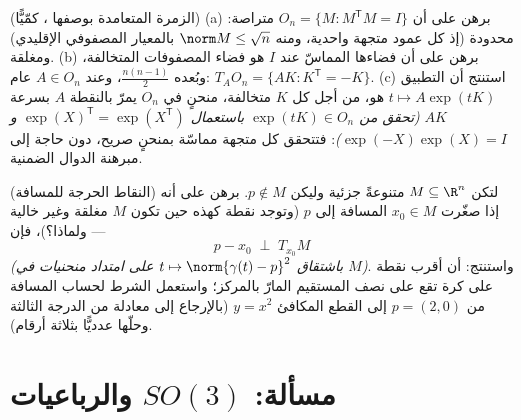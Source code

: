 \begin{exercise}[$\star\star$]\label{exo:b3:submanifolds:11}
(الزمرة المتعامدة بوصفها ، كمّيًّا)
(a) برهن على أن $O_n = \{M : M^{\mathsf T}M = I\}$ متراصة: محدودة (إذ كل عمود متجهة
واحدية، ومنه $\norm M \leq
\sqrt n$ بالمعيار المصفوفي الإقليدي) ومغلقة.
(b) برهن على أن فضاءها المماسّ عند $I$ هو فضاء المصفوفات
المتخالفة، وبُعده $\frac{n(n-1)}2$، وعند $A \in O_n$ عام:
$T_AO_n = \{AK : K^{\mathsf T} =
-K\}$.
(c) استنتج أن التطبيق $t \mapsto A\exp(tK)$ هو، من أجل كل $K$ متخالفة، منحنٍ
في $O_n$ يمرّ بالنقطة $A$ بسرعة $AK$ \emph{(تحقق من $\exp(tK) \in O_n$
باستعمال $\exp(X)^{\mathsf T} = \exp(X^{\mathsf T})$ و $\exp(-X)\exp(X) = I$)}: فتتحقق كل متجهة مماسّة بمنحنٍ
صريح، دون حاجة إلى مبرهنة الدوال الضمنية.
\end{exercise}

\begin{exercise}[$\star\star$]\label{exo:b3:submanifolds:12}
(النقاط الحرجة للمسافة) لتكن $M \subseteq \R^n$ متنوعةً جزئية وليكن
$p \notin M$. برهن على أنه إذا صغّرت $x_0 \in M$ المسافة إلى
$p$ (وتوجد نقطة كهذه حين تكون $M$ مغلقة وغير خالية --- ولماذا؟)،
فإن
\[
p - x_0 \;\perp\; T_{x_0}M
\]
\emph{(باشتقاق $t \mapsto \norm{\gamma(t) - p}^2$ على امتداد منحنيات في $M$)}. واستنتج: أن
أقرب نقطة على كرة تقع على نصف المستقيم المارّ بالمركز؛ واستعمل
الشرط لحساب المسافة من $p = (2, 0)$ إلى القطع المكافئ
$y = x^2$ (بالإرجاع إلى معادلة من الدرجة الثالثة وحلّها عدديًّا
بثلاثة أرقام).
\end{exercise}

\section{مسألة: \texorpdfstring{$SO(3)$}{SO(3)} والرباعيات}

